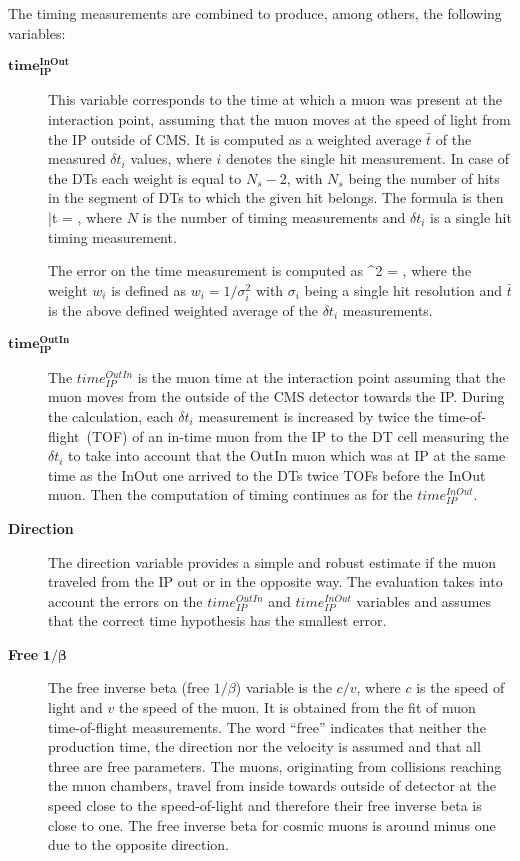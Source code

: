 The timing measurements are combined to produce, among others, the following variables: 

\begin{description}
\item [$\mathbf{time_{IP}^{InOut}}$]
This variable corresponds to the time at which a muon was present at the interaction point, assuming that the muon moves at the speed of light from the IP outside of CMS. It is computed as a weighted average $\bar{t}$ of the measured $\delta t_{i}$ values, where $i$ denotes the single hit measurement. In case of the DTs each weight is equal to $N_{s}-2$, with $N_{s}$ being the number of hits in the segment of DTs to which the given hit belongs. The formula is then
{
 \bar{t} =  \times {} \times {},
}
where $N$ is the number of timing measurements and $\delta t_{i}$ is a single hit timing measurement.

The error on the time measurement is computed as
{
 \sigma^{2} =  \times {} \times {},
}
where the weight $w_{i}$ is defined as $w_i = 1/\sigma_{i}^2$ with $\sigma_{i}$ being a single hit resolution and $\bar{t}$ is the above defined weighted average of the $\delta t_{i}$ measurements.

\item[$\mathbf{time_{IP}^{OutIn}}$ ]
The $time_{IP}^{OutIn}$ is the muon time at the interaction point assuming that the muon moves from the outside of the CMS detector towards the IP. During the calculation, each $\delta t_{i}$ measurement is increased by twice the time-of-flight~(TOF) of an in-time muon from the IP to the DT cell measuring the $\delta t_{i}$ to take into account that the OutIn muon which was at IP at the same time as the InOut one arrived to the DTs twice TOFs before the InOut muon. Then the computation of timing continues as for the $time_{IP}^{InOut}$.

\item[\textbf{Direction}]
The direction variable provides a simple and robust estimate if the muon traveled from the IP out or in the opposite way. The evaluation takes into account the errors on the $time_{IP}^{OutIn}$ and $time_{IP}^{InOut}$ variables and assumes that the correct time hypothesis has the smallest error.

\item[\textbf{Free} $\mathbf{1/\beta}$]
The free inverse beta (free $1/\beta$) variable is the $c/v$, where $c$ is the speed of light and $v$ the speed of the muon.  It is obtained from the fit of muon time-of-flight measurements. The word ``free'' indicates that neither the production time, the direction nor the velocity is assumed and that all three are free parameters. The muons, originating from collisions reaching the muon chambers, travel from inside towards outside of detector at the speed close to the speed-of-light and therefore their free inverse beta is close to one. The free inverse beta for cosmic muons is around minus one due to the opposite direction.


\end{description}
